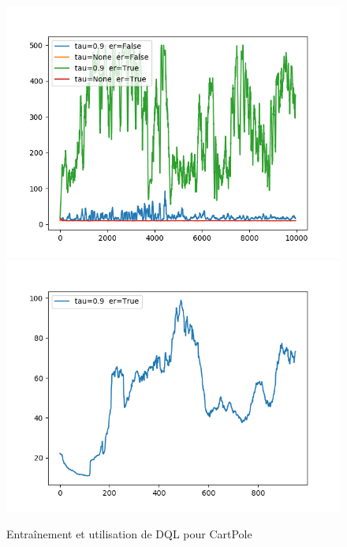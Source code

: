 \documentclass{standalone}
\begin{document}
		
		
		\begin{figure}[H]
		\center
		\includegraphics[scale=0.5]{img/dqlcartpolegamma099alpha0.png}
		\includegraphics[scale=0.5]{img/dqlcartpolegamma09alpha0.png}

		\caption{Entraînement et utilisation de DQL pour CartPole}
		\label{vae:samples}
	\end{figure}
\end{document}
